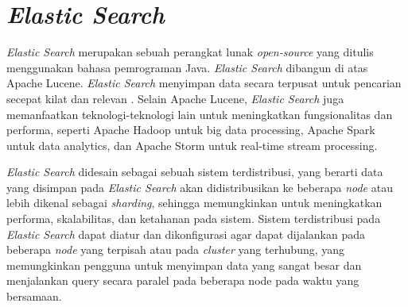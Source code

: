 \section{\textit{Elastic Search}}

\textit{Elastic Search} merupakan sebuah perangkat lunak \textit{open-source} yang ditulis menggunakan bahasa pemrograman Java. \textit{Elastic Search} dibangun di atas Apache Lucene. \textit{Elastic Search} menyimpan data secara terpusat untuk pencarian secepat kilat dan relevan \parencite{elasticsearchorigin}. Selain Apache Lucene, \textit{Elastic Search} juga memanfaatkan teknologi-teknologi lain untuk meningkatkan fungsionalitas dan performa, seperti Apache Hadoop untuk big data processing, Apache Spark untuk data analytics, dan Apache Storm untuk real-time stream processing.

\textit{Elastic Search} didesain sebagai sebuah sistem terdistribusi, yang berarti data yang disimpan pada \textit{Elastic Search} akan didistribusikan ke beberapa \textit{node} atau lebih dikenal sebagai \textit{sharding}, sehingga memungkinkan untuk meningkatkan performa, skalabilitas, dan ketahanan pada sistem. Sistem terdistribusi pada \textit{Elastic Search} dapat diatur dan dikonfigurasi agar dapat dijalankan pada beberapa \textit{node} yang terpisah atau pada \textit{cluster} yang terhubung, yang memungkinkan pengguna untuk menyimpan data yang sangat besar dan menjalankan query secara paralel pada beberapa node pada waktu yang bersamaan.

